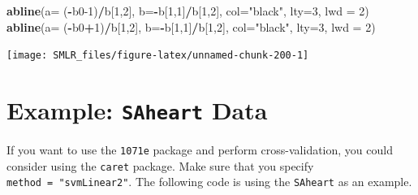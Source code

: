 \documentclass[
]{book}
\newenvironment{Shaded}{\begin{snugshade}}{\end{snugshade}}
\newcommand{\AttributeTok}[1]{\textcolor[rgb]{0.13,0.29,0.53}{#1}}
\newcommand{\DecValTok}[1]{\textcolor[rgb]{0.00,0.00,0.81}{#1}}
\newcommand{\FunctionTok}[1]{\textcolor[rgb]{0.13,0.29,0.53}{\textbf{#1}}}
\newcommand{\NormalTok}[1]{#1}
\newcommand{\SpecialCharTok}[1]{\textcolor[rgb]{0.81,0.36,0.00}{\textbf{#1}}}
\newcommand{\StringTok}[1]{\textcolor[rgb]{0.31,0.60,0.02}{#1}}
\theoremstyle{definition}
\theoremstyle{definition}
\theoremstyle{definition}
\theoremstyle{definition}
\theoremstyle{remark}
\begin{document}
\begin{Shaded}
\begin{Highlighting}[]
    \FunctionTok{abline}\NormalTok{(}\AttributeTok{a=}\NormalTok{ (}\SpecialCharTok{{-}}\NormalTok{b0}\DecValTok{{-}1}\NormalTok{)}\SpecialCharTok{/}\NormalTok{b[}\DecValTok{1}\NormalTok{,}\DecValTok{2}\NormalTok{], }\AttributeTok{b=}\SpecialCharTok{{-}}\NormalTok{b[}\DecValTok{1}\NormalTok{,}\DecValTok{1}\NormalTok{]}\SpecialCharTok{/}\NormalTok{b[}\DecValTok{1}\NormalTok{,}\DecValTok{2}\NormalTok{], }\AttributeTok{col=}\StringTok{"black"}\NormalTok{, }\AttributeTok{lty=}\DecValTok{3}\NormalTok{, }\AttributeTok{lwd =} \DecValTok{2}\NormalTok{)}
    \FunctionTok{abline}\NormalTok{(}\AttributeTok{a=}\NormalTok{ (}\SpecialCharTok{{-}}\NormalTok{b0}\SpecialCharTok{+}\DecValTok{1}\NormalTok{)}\SpecialCharTok{/}\NormalTok{b[}\DecValTok{1}\NormalTok{,}\DecValTok{2}\NormalTok{], }\AttributeTok{b=}\SpecialCharTok{{-}}\NormalTok{b[}\DecValTok{1}\NormalTok{,}\DecValTok{1}\NormalTok{]}\SpecialCharTok{/}\NormalTok{b[}\DecValTok{1}\NormalTok{,}\DecValTok{2}\NormalTok{], }\AttributeTok{col=}\StringTok{"black"}\NormalTok{, }\AttributeTok{lty=}\DecValTok{3}\NormalTok{, }\AttributeTok{lwd =} \DecValTok{2}\NormalTok{)}
\end{Highlighting}
\end{Shaded}

\begin{center}\texttt{[image: SMLR\_files/figure-latex/unnamed-chunk-200-1]} \end{center}

\hypertarget{example-saheart-data}{%
\section{\texorpdfstring{Example: \texttt{SAheart} Data}{Example: SAheart Data}}\label{example-saheart-data}}

If you want to use the \texttt{1071e} package and perform cross-validation, you could consider using the \texttt{caret} package. Make sure that you specify \texttt{method\ =\ "svmLinear2"}. The following code is using the \texttt{SAheart} as an example.
\end{document}

